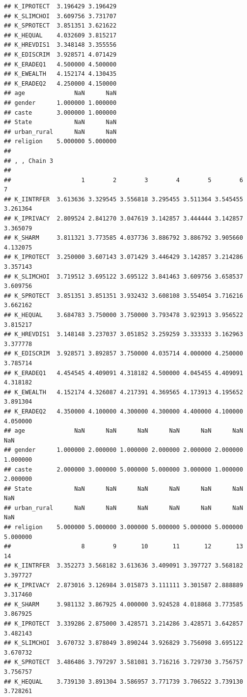 \documentclass[
]{article}
\begin{document}
\begin{verbatim}
## K_IPROTECT  3.196429 3.196429
## K_SLIMCHOI  3.609756 3.731707
## K_SPROTECT  3.851351 3.621622
## K_HEQUAL    4.032609 3.815217
## K_HREVDIS1  3.348148 3.355556
## K_EDISCRIM  3.928571 4.071429
## K_ERADEQ1   4.500000 4.500000
## K_EWEALTH   4.152174 4.130435
## K_ERADEQ2   4.250000 4.150000
## age              NaN      NaN
## gender      1.000000 1.000000
## caste       3.000000 1.000000
## State            NaN      NaN
## urban_rural      NaN      NaN
## religion    5.000000 5.000000
## 
## , , Chain 3
## 
##                    1        2        3        4        5        6        7
## K_IINTRFER  3.613636 3.329545 3.556818 3.295455 3.511364 3.545455 3.261364
## K_IPRIVACY  2.809524 2.841270 3.047619 3.142857 3.444444 3.142857 3.365079
## K_SHARM     3.811321 3.773585 4.037736 3.886792 3.886792 3.905660 4.132075
## K_IPROTECT  3.250000 3.607143 3.071429 3.446429 3.142857 3.214286 3.357143
## K_SLIMCHOI  3.719512 3.695122 3.695122 3.841463 3.609756 3.658537 3.609756
## K_SPROTECT  3.851351 3.851351 3.932432 3.608108 3.554054 3.716216 3.662162
## K_HEQUAL    3.684783 3.750000 3.750000 3.793478 3.923913 3.956522 3.815217
## K_HREVDIS1  3.148148 3.237037 3.051852 3.259259 3.333333 3.162963 3.377778
## K_EDISCRIM  3.928571 3.892857 3.750000 4.035714 4.000000 4.250000 3.785714
## K_ERADEQ1   4.454545 4.409091 4.318182 4.500000 4.045455 4.409091 4.318182
## K_EWEALTH   4.152174 4.326087 4.217391 4.369565 4.173913 4.195652 3.891304
## K_ERADEQ2   4.350000 4.100000 4.300000 4.300000 4.400000 4.100000 4.050000
## age              NaN      NaN      NaN      NaN      NaN      NaN      NaN
## gender      1.000000 2.000000 1.000000 2.000000 2.000000 2.000000 1.000000
## caste       2.000000 3.000000 5.000000 5.000000 3.000000 1.000000 2.000000
## State            NaN      NaN      NaN      NaN      NaN      NaN      NaN
## urban_rural      NaN      NaN      NaN      NaN      NaN      NaN      NaN
## religion    5.000000 5.000000 3.000000 5.000000 5.000000 5.000000 5.000000
##                    8        9       10       11       12       13       14
## K_IINTRFER  3.352273 3.568182 3.613636 3.409091 3.397727 3.568182 3.397727
## K_IPRIVACY  2.873016 3.126984 3.015873 3.111111 3.301587 2.888889 3.317460
## K_SHARM     3.981132 3.867925 4.000000 3.924528 4.018868 3.773585 3.867925
## K_IPROTECT  3.339286 2.875000 3.428571 3.214286 3.428571 3.642857 3.482143
## K_SLIMCHOI  3.670732 3.878049 3.890244 3.926829 3.756098 3.695122 3.670732
## K_SPROTECT  3.486486 3.797297 3.581081 3.716216 3.729730 3.756757 3.756757
## K_HEQUAL    3.739130 3.891304 3.586957 3.771739 3.706522 3.739130 3.728261

\end{verbatim}
\end{document}
